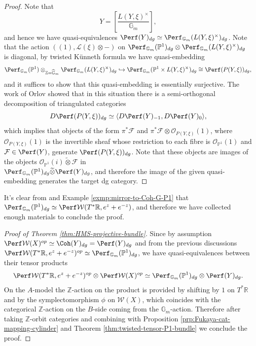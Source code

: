 \begin{proof}
    Note that \[
        Y=\left[\frac{L(Y,\xi)^{\times}}{\mathbb{G}_m}\right],
    \]and hence we have quasi-equivalences $\Perf (Y)_{dg}\simeq\Perf_{\mathbb{G}_m} (L(Y,\xi)^{\times})_{dg}$. Note that the action $((1),\mathcal{L} (\xi)\otimes -)$ on $\Perf_{\mathbb{G}_m} (\mathbb{P}^1)_{dg}\otimes\Perf_{\mathbb{G}_m} (L(Y,\xi)^{\times})_{dg}$ is diagonal, by twisted K\"unneth formula we have quasi-embedding \[
        \Perf_{\mathbb{G}_m} (\mathbb{P}^1)\otimes_{\mathbb{Z}=\widehat{\mathbb{G}}_m}\Perf_{\mathbb{G}_m} (L(Y,\xi)^{\times})_{dg}\hookrightarrow\Perf_{\mathbb{G}_m} (\mathbb{P}^1\times L(Y,\xi)^{\times} )_{dg}\cong\Perf (P(Y,\xi))_{dg},
    \]and it suffices to show that this quasi-embedding is essentially surjective. The work of Orlov \cite{Orlov92} showed that in this situation there is a semi-orthogonal decomposition of triangulated categories \[
    D\Perf (P(Y,\xi))_{dg}\simeq\langle D\Perf(Y)_{-1}, D\Perf(Y)_0\rangle,
    \]which implies that objects of the form $\pi^{\ast}\mathcal{F}$ and $\pi^{\ast}\mathcal{F}\otimes\mathcal{O}_{P(Y,\xi)} (1)$, where $\mathcal{O}_{P(Y,\xi)} (1)$ is the invertible sheaf whose restriction to each fibre is $\mathcal{O}_{\mathbb{P}^1} (1)$ and $\mathcal{F}\in\Perf (Y)$, generate $\Perf(P(Y,\xi))_{dg}$. Note that these objects are images of the objects $\mathcal{O}_{\mathbb{P}^1} (i)\widetilde{\otimes}\mathcal{F}$ in\\$\Perf_{\mathbb{G}_m} (\mathbb{P}^1)_{dg}\widetilde{\otimes}\Perf (Y)_{dg}$, and therefore the image of the given quasi-embedding generates the target dg category.
\end{proof} 
It's clear from \cite{FLTZ12} and Example \ref{exmp:mirror-to-Coh-G-P1} that $\Perf_{\mathbb{G}_m} (\mathbb{P}^1)_{dg}\simeq\Perf\mathcal{W} (T^{\ast}\mathbb{R},e^z+e^{-z})$, and therefore we have collected enough materials to conclude the proof.
\begin{proof}[Proof of Theorem \ref{thm:HMS-projective-bundle}]
    Since by assumption $\Perf\mathcal{W} (X)^{op}\simeq\Coh (Y)_{dg}=\Perf (Y)_{dg}$ and from the previous discussions $\Perf\mathcal{W} (T^{\ast}\mathbb{R},e^z+e^{-z})^{op}\simeq\Perf_{\mathbb{G}_m} (\mathbb{P}^1)_{dg}$, we have quasi-equivalences between their tensor products \[
        \Perf\mathcal{W} (T^{\ast}\mathbb{R},e^z+e^{-z})^{op}\otimes\Perf\mathcal{W} (X)^{op}\simeq\Perf_{\mathbb{G}_m} (\mathbb{P}^1)_{dg}\otimes\Perf (Y)_{dg}.
    \]On the $A$-model the $\mathbb{Z}$-action on the product is provided by shifting by $1$ on $T^{\ast}\mathbb{R}$ and by the symplectomorphism $\phi$ on $\mathcal{W} (X)$, which coincides with the categorical $\mathbb{Z}$-action on the $B$-side coming from the $\mathbb{G}_m$-action. Therefore after taking $\mathbb{Z}$-orbit categories and combining with Proposition \ref{prp:Fukaya-cat-mapping-cylinder} and Theorem \ref{thm:twisted-tensor-P1-bundle} we conclude the proof.
\end{proof}
